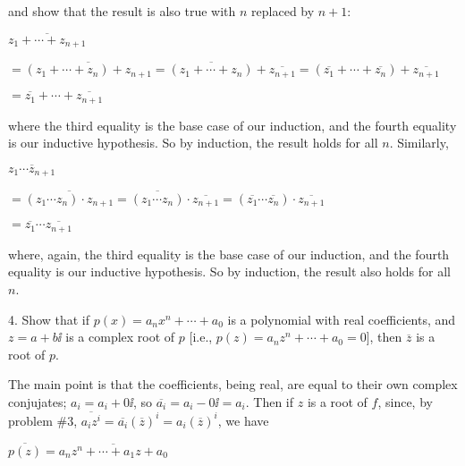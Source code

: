 \ssk

\item{} and show that the result is also true with $n$ replaced by $n+1$:

\vfill\eject

\item{} $\overline{z_1+\cdots +z_{n+1}}$

$ = \overline{(z_1+\cdots +z_n)+z_{n+1}}
= \overline{(z_1+\cdots +z_n)}+\overline{z_{n+1}} =
(\overline{z_1}+\cdots +\overline{z_n})+\overline{z_{n+1}}$

$ = \overline{z_1}+\cdots +\overline{z_{n+1}}$

\ssk

\item{} where the third equality is the base case of our induction, and the fourth equality 
is our inductive hypothesis. So by induction, the result holds for all $n$.
Similarly, 

\msk

\item{} $\overline{z_1\cdots z_{n+1}}$

$ = \overline{(z_1\cdots z_n)\cdot z_{n+1}} =
\overline{(z_1\cdots z_n)}\cdot\overline{z_{n+1}} =
(\overline{z_1}\cdots \overline{z_n})\cdot\overline{z_{n+1}}$

$ =
\overline{z_1}\cdots \overline{z_{n+1}}$

\ssk

\item{} where, again, the third equality is the base case of our induction, and the fourth equality 
is our inductive hypothesis. So by induction, the result also holds for all $n$.

\bsk

\item{4.} Show that if $p(x)=a_nx^n+\cdots +a_0$ is a polynomial with
real coefficients, and $z=a+b\ii$ is a complex root of $p$ [i.e., 
$p(z)=a_nz^n+\cdots +a_0=0$], then $\overline{z}$ is  a root of $p$.

\msk

\item{} The main point is that the coefficients, being real, are equal to their own complex conjujates;
$a_i=a_i+0\ii$, so $\overline{a_i}=a_i-0\ii=a_i$. Then if $z$ is a root of $f$, since, by problem 
\#3, $\overline{a_iz^i}=\overline{a_i}(\overline{z})^i=a_i(\overline{z})^i$, we have

\ssk

\item{} $\overline{p(z)} = 
\overline{a_nz^n+\cdots +a_1z+a_0}$

